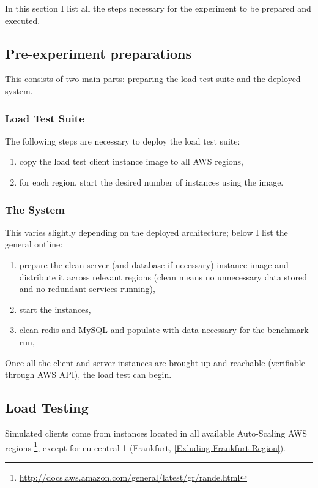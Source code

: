 \documentclass{uvamscse}
\begin{document}
In this section I list all the steps necessary for the experiment to be prepared and executed.

\subsection{Pre-experiment preparations}

This consists of two main parts: preparing the load test suite and the deployed system.

\subsubsection{Load Test Suite}

The following steps are necessary to deploy the load test suite:
\begin{enumerate}
  \item copy the load test client instance image to all AWS regions,
  \item for each region, start the desired number of instances using the image.
\end{enumerate}

\subsubsection{The System}

This varies slightly depending on the deployed architecture; below I list the general outline:
\begin{enumerate}
  \item prepare the clean server (and database if necessary) instance image and distribute it across relevant regions (clean means no unnecessary data stored and no redundant services running),
  \item start the instances,
  \item clean redis and MySQL and populate with data necessary for the benchmark run,
\end{enumerate}

Once all the client and server instances are brought up and reachable (verifiable through AWS API), the load test can begin.

\subsection{Load Testing}\label{Load Testing}

Simulated clients come from instances located in all available Auto-Scaling AWS regions \footnote{\url{http://docs.aws.amazon.com/general/latest/gr/rande.html}}, except for eu-central-1 (Frankfurt, \ref{Exluding Frankfurt Region}).
\end{document}
